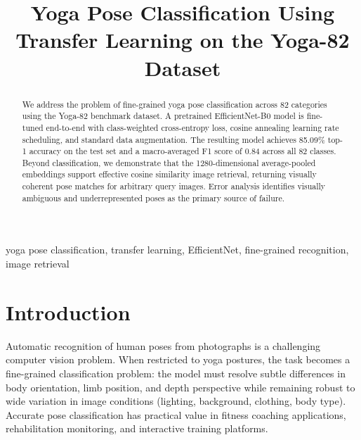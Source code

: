 \documentclass[conference]{IEEEtran}
\begin{document}
\title{Yoga Pose Classification Using Transfer Learning on the Yoga-82 Dataset}

\author{
\and
{}

}

\maketitle

\begin{abstract}
We address the problem of fine-grained yoga pose classification across 82 categories using the Yoga-82 benchmark dataset. A pretrained EfficientNet-B0 model is fine-tuned end-to-end with class-weighted cross-entropy loss, cosine annealing learning rate scheduling, and standard data augmentation. The resulting model achieves 85.09\% top-1 accuracy on the test set and a macro-averaged F1 score of 0.84 across all 82 classes. Beyond classification, we demonstrate that the 1280-dimensional average-pooled embeddings support effective cosine similarity image retrieval, returning visually coherent pose matches for arbitrary query images. Error analysis identifies visually ambiguous and underrepresented poses as the primary source of failure.
\end{abstract}

\begin{IEEEkeywords}
yoga pose classification, transfer learning, EfficientNet, fine-grained recognition, image retrieval
\end{IEEEkeywords}


\section{Introduction}

Automatic recognition of human poses from photographs is a challenging computer vision problem. When restricted to yoga postures, the task becomes a fine-grained classification problem: the model must resolve subtle differences in body orientation, limb position, and depth perspective while remaining robust to wide variation in image conditions (lighting, background, clothing, body type). Accurate pose classification has practical value in fitness coaching applications, rehabilitation monitoring, and interactive training platforms.
\end{document}
